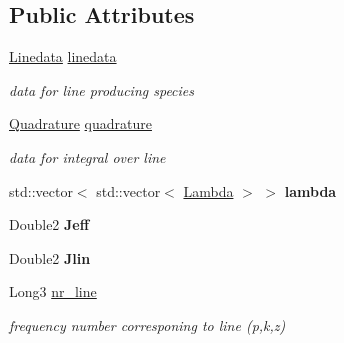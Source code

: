 \subsection*{Public Attributes}
\begin{DoxyCompactItemize}
\item 
\mbox{\label{structLineProducingSpecies_af82c9246277856fe9a85fee5efc020a9}} 
\mbox{\hyperlink{structLinedata}{Linedata}} \mbox{\hyperlink{structLineProducingSpecies_af82c9246277856fe9a85fee5efc020a9}{linedata}}
\begin{DoxyCompactList}\small\item\em data for line producing species \end{DoxyCompactList}\item 
\mbox{\label{structLineProducingSpecies_a5ddef72c65be1892caa3260ff4c671fb}} 
\mbox{\hyperlink{structQuadrature}{Quadrature}} \mbox{\hyperlink{structLineProducingSpecies_a5ddef72c65be1892caa3260ff4c671fb}{quadrature}}
\begin{DoxyCompactList}\small\item\em data for integral over line \end{DoxyCompactList}\item 
\mbox{\label{structLineProducingSpecies_a476b6eff37715b47fcece3ea21bea8f9}} 
std\+::vector$<$ std\+::vector$<$ \mbox{\hyperlink{structLambda}{Lambda}} $>$ $>$ {\bfseries lambda}
\item 
\mbox{\label{structLineProducingSpecies_a633ab10bbe9df398e2ad92fe4dc082c0}} 
Double2 {\bfseries Jeff}
\item 
\mbox{\label{structLineProducingSpecies_a3de194bf4535cff2d431bf1e337c5df6}} 
Double2 {\bfseries Jlin}
\item 
\mbox{\label{structLineProducingSpecies_af3112742ce529751bcd6d370fbb25ec6}} 
Long3 \mbox{\hyperlink{structLineProducingSpecies_af3112742ce529751bcd6d370fbb25ec6}{nr\+\_\+line}}
\begin{DoxyCompactList}\small\item\em frequency number corresponing to line (p,k,z) \end{DoxyCompactList}\item 

\end{DoxyCompactItemize}
